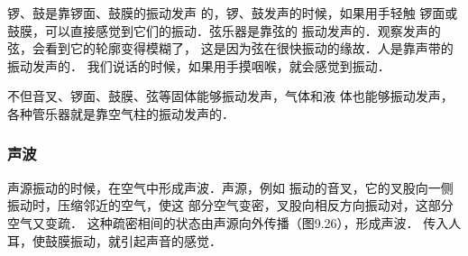 锣、鼓是靠锣面、鼓膜的振动发声
的，锣、鼓发声的时候，如果用手轻触
锣面或鼓膜，可以直接感觉到它们的振动．弦乐器是靠弦的
振动发声的．观察发声的弦，会看到它的轮廓变得模糊了，
这是因为弦在很快振动的缘故．人是靠声带的振动发声的．
我们说话的时候，如果用手摸咽喉，就会感觉到振动．

不但音叉、锣面、鼓膜、弦等固体能够振动发声，气体和液
体也能够振动发声，各种管乐器就是靠空气柱的振动发声的．

\subsubsection{声波}

声源振动的时候，在空气中形成声波．声源，例如
振动的音叉，它的叉股向一侧振动时，压缩邻近的空气，使这
部分空气变密，叉股向相反方向振动对，这部分空气又变疏．
这种疏密相间的状态由声源向外传播（图9.26），形成声波．
传入人耳，使鼓膜振动，就引起声音的感觉．
